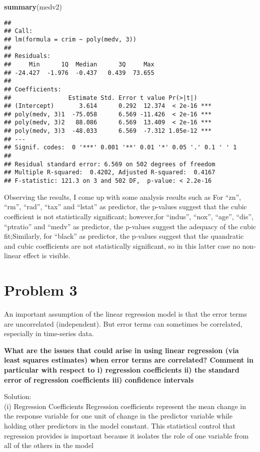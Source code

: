 \documentclass[]{article}
\newenvironment{Shaded}{\begin{snugshade}}{\end{snugshade}}
\newcommand{\KeywordTok}[1]{\textcolor[rgb]{0.13,0.29,0.53}{\textbf{#1}}}
\newcommand{\NormalTok}[1]{#1}
\begin{document}
\begin{Shaded}
\begin{Highlighting}[]
\KeywordTok{summary}\NormalTok{(medv2)}
\end{Highlighting}
\end{Shaded}

\begin{verbatim}
## 
## Call:
## lm(formula = crim ~ poly(medv, 3))
## 
## Residuals:
##     Min      1Q  Median      3Q     Max 
## -24.427  -1.976  -0.437   0.439  73.655 
## 
## Coefficients:
##                Estimate Std. Error t value Pr(>|t|)    
## (Intercept)       3.614      0.292  12.374  < 2e-16 ***
## poly(medv, 3)1  -75.058      6.569 -11.426  < 2e-16 ***
## poly(medv, 3)2   88.086      6.569  13.409  < 2e-16 ***
## poly(medv, 3)3  -48.033      6.569  -7.312 1.05e-12 ***
## ---
## Signif. codes:  0 '***' 0.001 '**' 0.01 '*' 0.05 '.' 0.1 ' ' 1
## 
## Residual standard error: 6.569 on 502 degrees of freedom
## Multiple R-squared:  0.4202, Adjusted R-squared:  0.4167 
## F-statistic: 121.3 on 3 and 502 DF,  p-value: < 2.2e-16
\end{verbatim}

Observing the results, I come up with some analysis results such as For
``zn'', ``rm'', ``rad'', ``tax'' and ``lstat'' as predictor, the
p-values suggest that the cubic coefficient is not statistically
significant; however,for ``indus'', ``nox'', ``age'', ``dis'',
``ptratio'' and ``medv'' as predictor, the p-values suggest the adequacy
of the cubic fit;Similarly, for ``black'' as predictor, the p-values
suggest that the quandratic and cubic coefficients are not statistically
significant, so in this latter case no non-linear effect is visible.

\section{Problem 3}\label{problem-3}

An important assumption of the linear regression model is that the error
terms are uncorrelated (independent). But error terms can sometimes be
correlated, especially in time-series data.

\textbf{What are the issues that could arise in using linear regression
(via least squares estimates) when error terms are correlated? Comment
in particular with respect to i) regression coefficients ii) the
standard error of regression coefficients iii) confidence intervals}

Solution:\\
(i) Regression Coefficients Regression coefficients represent the mean
change in the response variable for one unit of change in the predictor
variable while holding other predictors in the model constant. This
statistical control that regression provides is important because it
isolates the role of one variable from all of the others in the model
\end{document}
